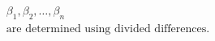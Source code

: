 \documentclass[preview]{standalone}
\begin{document}
\begin{align*}
\beta_1, \beta_2, \dots, \beta_n \quad \\ \text{are determined using divided differences.}
\end{align*}
\end{document}
